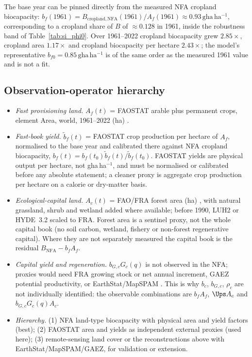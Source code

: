 The base year can be pinned directly from the measured NFA cropland biocapacity: $b_f(1961)=B_{\mathrm{cropland,NFA}}(1961)/A_f(1961)\approx0.93\,\mathrm{gha\,ha^{-1}}$, corresponding to a cropland share of $B$ of $\approx0.128$ in 1961, inside the robustness band of Table~\ref{tab:si_phi0}. Over 1961--2022 cropland biocapacity grew $2.85\times$, cropland area $1.17\times$ and cropland biocapacity per hectare $2.43\times$; the model's representative $b_{f0}=0.85\,\mathrm{gha\,ha^{-1}}$ is of the same order as the measured 1961 value and is not a fit.

\subsection{Observation-operator hierarchy}\label{si:operator}

\begin{itemize}[leftmargin=1.5em]
\item \emph{Fast provisioning land.} $A_f(t)$ = FAOSTAT arable plus permanent crops, element Area, world, 1961--2022 (ha) \citep{FAO2023}.
\item \emph{Fast-book yield.} $\tilde b_f(t)$ = FAOSTAT crop production per hectare of $A_f$, normalised to the base year and calibrated there against NFA cropland biocapacity, $b_f(t)=b_f(t_0)\tilde b_f(t)/\tilde b_f(t_0)$. FAOSTAT yields are physical output per hectare, not gha\,ha$^{-1}$, and must be normalised or calibrated before any absolute statement; a cleaner proxy is aggregate crop production per hectare on a calorie or dry-matter basis.
\item \emph{Ecological-capital land.} $A_c(t)$ = FAO/FRA forest area (ha) \citep{FAO2020}, with natural grassland, shrub and wetland added where available; before 1990, LUH2 \citep{Hurtt2011} or HYDE~3.2 \citep{KleinGoldewijk2017} scaled to FRA. Forest area is a sentinel proxy, not the whole capital book (no soil carbon, wetland, fishery or non-forest regenerative capital). Where they are not separately measured the capital book is the residual $B_{\mathrm{NFA}}-b_fA_f$.
\item \emph{Capital yield and regeneration.} $b_{G,c}G_c(q)$ is not observed in the NFA; proxies would need FRA growing stock or net annual increment, GAEZ potential productivity, or EarthStat/MapSPAM \citep{Monfreda2008}. This is why $b_c$, $b_{G,c}$, $\rho_c$ are not individually identified: the observable combinations are $b_fA_f$, $\Ups A_c$ and $b_{G,c}G_c(q)A_c$.
\item \emph{Hierarchy.} (1) NFA land-type biocapacity with physical area and yield factors (best); (2) FAOSTAT area and yields as independent external proxies (used here); (3) remote-sensing land cover \citep{ESA2017,Copernicus2019} or the reconstructions above with EarthStat/MapSPAM/GAEZ, for validation or extension.
\end{itemize}

